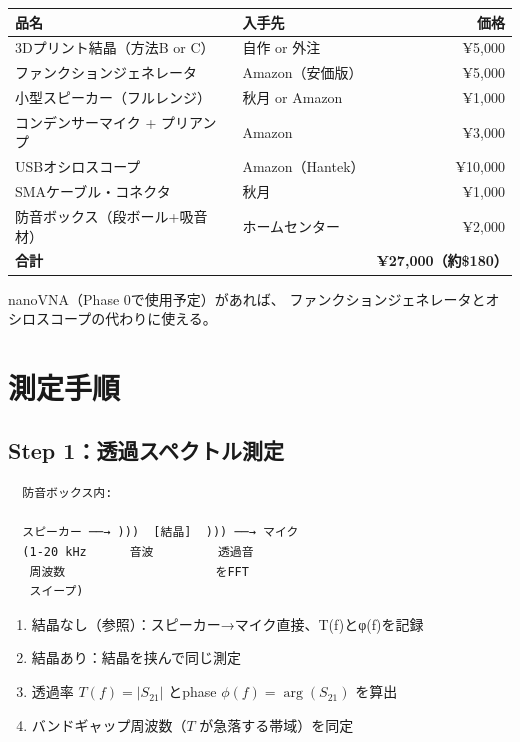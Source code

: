 \documentclass[11pt,a4paper]{article}
\begin{document}
\begin{tcolorbox}[colback=blue!5,colframe=blue!50!black,title=部品リスト]
\begin{tabular}{llr}
\toprule
品名 & 入手先 & 価格 \\
\midrule
3Dプリント結晶（方法B or C） & 自作 or 外注 & ¥5,000 \\
ファンクションジェネレータ & Amazon（安価版） & ¥5,000 \\
小型スピーカー（フルレンジ） & 秋月 or Amazon & ¥1,000 \\
コンデンサーマイク + プリアンプ & Amazon & ¥3,000 \\
USBオシロスコープ & Amazon（Hantek） & ¥10,000 \\
SMAケーブル・コネクタ & 秋月 & ¥1,000 \\
防音ボックス（段ボール+吸音材） & ホームセンター & ¥2,000 \\
\midrule
\textbf{合計} & & \textbf{¥27,000（約\$180）} \\
\bottomrule
\end{tabular}
\end{tcolorbox}

nanoVNA（Phase 0で使用予定）があれば、
ファンクションジェネレータとオシロスコープの代わりに使える。

\section{測定手順}

\subsection{Step 1：透過スペクトル測定}

\begin{verbatim}
  防音ボックス内:

  スピーカー ──→ )))  [結晶]  ))) ──→ マイク
  (1-20 kHz      音波         透過音
   周波数                     をFFT
   スイープ)
\end{verbatim}

\begin{enumerate}
\item 結晶なし（参照）：スピーカー→マイク直接、T(f)とφ(f)を記録
\item 結晶あり：結晶を挟んで同じ測定
\item 透過率 $T(f) = |S_{21}|$ とphase $\phi(f) = \arg(S_{21})$ を算出
\item バンドギャップ周波数（$T$ が急落する帯域）を同定
\end{enumerate}
\end{document}
